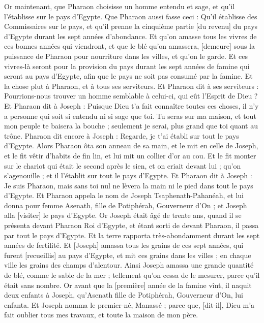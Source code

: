 \begin{multicols}{2}
Or maintenant, que Pharaon choisisse un homme entendu et sage, et qu'il l'établisse sur le pays d'Egypte.
Que Pharaon aussi fasse ceci : Qu'il établisse des Commissaires sur le pays, et qu'il prenne la cinquième partie [du revenu] du pays d'Egypte durant les sept années d'abondance.
Et qu'on amasse tous les vivres de ces bonnes années qui viendront, et que le blé qu'on amassera, [demeure] sous la puissance de Pharaon pour nourriture dans les villes, et qu'on le garde.
Et ces vivres-là seront pour la provision du pays durant les sept années de famine qui seront au pays d'Egypte, afin que le pays ne soit pas consumé par la famine.
Et la chose plut à Pharaon, et à tous ses serviteurs.
Et Pharaon dit à ses serviteurs : Pourrions-nous trouver un homme semblable à celui-ci, qui eût l'Esprit de Dieu ?
Et Pharaon dit à Joseph : Puisque Dieu t'a fait connaître toutes ces choses, il n'y a personne qui soit si entendu ni si sage que toi.
Tu seras sur ma maison, et tout mon peuple te baisera la bouche ; seulement je serai, plus grand que toi quant au trône.
Pharaon dit encore à Joseph : Regarde, je t'ai établi sur tout le pays d'Egypte.
Alors Pharaon ôta son anneau de sa main, et le mit en celle de Joseph, et le fit vêtir d'habits de fin lin, et lui mit un collier d'or au cou.
Et le fit monter sur le chariot qui était le second après le sien, et on criait devant lui ; qu'on s'agenouille ; et il l'établit sur tout le pays d'Egypte.
Et Pharaon dit à Joseph : Je suis Pharaon, mais sans toi nul ne lèvera la main ni le pied dans tout le pays d'Egypte.
Et Pharaon appela le nom de Joseph Tsaphenath-Pahanéah, et lui donna pour femme Asenath, fille de Potiphérah, Gouverneur d'On ; et Joseph alla [visiter] le pays d'Egypte.
Or Joseph était âgé de trente ans, quand il se présenta devant Pharaon Roi d'Egypte, et étant sorti de devant Pharaon, il passa par tout le pays d'Egypte.
Et la terre rapporta très-abondamment durant les sept années de fertilité.
Et [Joseph] amassa tous les grains de ces sept années, qui furent [recueillis] au pays d'Egypte, et mit ces grains dans les villes ; en chaque ville les grains des champs d'alentour.
Ainsi Joseph amassa une grande quantité de blé, comme le sable de la mer ; tellement qu'on cessa de le mesurer, parce qu'il était sans nombre.
Or avant que la [première] année de la famine vînt, il naquit deux enfants à Joseph, qu'Asenath fille de Potiphérah, Gouverneur d'On, lui enfanta.
Et Joseph nomma le premier-né, Manassé ; parce que, [dit-il], Dieu m'a fait oublier tous mes travaux, et toute la maison de mon père.

\end{multicols}

